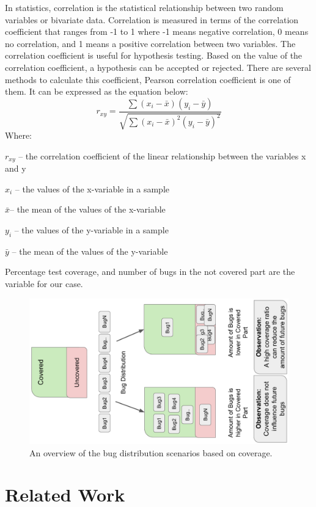 \documentclass[sigconf,nonacm]{acmart}
\begin{document}
In statistics, correlation is the statistical relationship between two random variables or bivariate data. Correlation is measured in terms of the correlation coefficient that ranges from -1 to 1 where -1 means negative correlation, 0 means no correlation, and 1 means a positive correlation between two variables. The correlation coefficient is useful for hypothesis testing. Based on the value of the correlation coefficient, a hypothesis can be accepted or rejected. There are several methods to calculate this coefficient, Pearson correlation coefficient is one of them. It can be expressed as the equation below:
\begin{equation}
r_{xy} = \dfrac{\sum{(x_{i}-\bar{x})(y_{i}-\bar{y})}}{\sqrt{\sum{{(x_{i}-\bar{x})}^{2}{(y_{i}-\bar{y})}^{2}}}}
\label{eq:1}
\end{equation}
Where:

$r_{xy}$ – the correlation coefficient of the linear relationship between the variables x and y

$x_{i}$ – the values of the x-variable in a sample

$\bar{x}$– the mean of the values of the x-variable

$y_{i}$ – the values of the y-variable in a sample

$\bar{y}$ – the mean of the values of the y-variable


Percentage test coverage, and number of bugs in the not covered part are the variable for our case.

\begin{figure}[h]
	\centering
	\includegraphics[scale=0.7, angle=-90,width=0.5\linewidth]{img/cov_scn.pdf}
	\caption{An overview of the bug distribution scenarios based on coverage. \cite{similar}}
	\label{fig:cov_scn}
\end{figure}


\section{Related Work}
\end{document}
